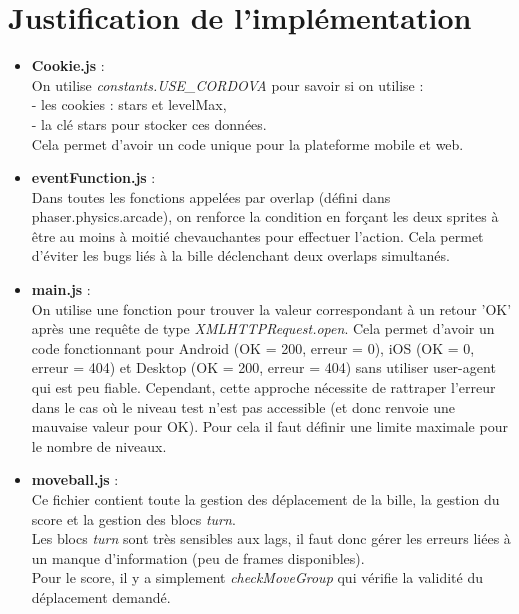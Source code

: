\documentclass[11pt]{article}
\begin{document}
\section {Justification de l'implémentation}
\begin{itemize}
	\item
		\textbf{Cookie.js} :\\
		On utilise {\em constants.USE\_CORDOVA} pour savoir si on 
		utilise :\\
		- les cookies : stars et levelMax, \\
		- la clé stars pour stocker ces données.\\
		Cela permet d'avoir un code unique pour la plateforme mobile et
		web.\\
	\item
		\textbf{eventFunction.js} :\\
		Dans toutes les fonctions appelées par overlap (défini dans 
		phaser.physics.arcade), on renforce la condition en forçant les
		deux sprites à être au moins à moitié chevauchantes pour
		effectuer l'action. Cela permet d'éviter les bugs liés à la
		bille déclenchant deux overlaps simultanés.\\
	\item
		\textbf{main.js} : \\
		On utilise une fonction pour trouver la valeur correspondant à
		un retour 'OK' après une requête de type 
		{\em XMLHTTPRequest.open}. Cela permet d'avoir un code
		fonctionnant pour Android (OK = 200, erreur = 0), iOS (OK = 0,
		erreur = 404) et Desktop (OK = 200, erreur = 404)
		sans utiliser user-agent qui est peu fiable. Cependant, cette
		approche nécessite de rattraper l'erreur dans le cas où le 
		niveau test n'est pas accessible (et donc renvoie une mauvaise 
		valeur pour OK). Pour cela il faut définir une limite maximale
		pour le nombre de niveaux.\\
	\item
		\textbf{moveball.js} : \\
		Ce fichier contient toute la gestion des déplacement de la
		bille, la gestion du score et la gestion des blocs {\em turn}.\\
		Les blocs {\em turn} sont très sensibles aux lags, il faut
		donc gérer les erreurs liées à un manque d'information (peu de 
		frames disponibles).\\
		Pour le score, il y a simplement {\em checkMoveGroup} qui
		vérifie la validité du déplacement demandé.\\
\end{itemize}
\end{document}
